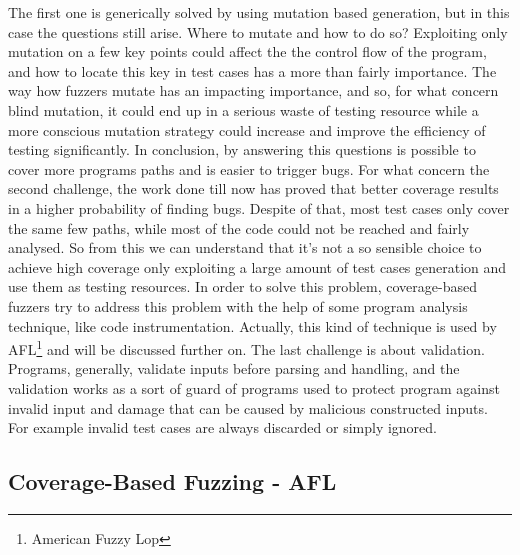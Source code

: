 The first one is generically solved by using mutation based generation, but in this case the questions still
arise. Where to mutate and how to do so? Exploiting only mutation on a few key points could affect the the control flow of the program, and how to locate this key  in test cases has a more than fairly importance.
The way how fuzzers mutate has an impacting importance, and so, for what concern blind mutation, it could end up in a serious waste of testing resource while a more conscious mutation strategy could increase and improve the efficiency
of testing significantly. In conclusion, by answering this questions is possible to cover more programs paths and is easier to trigger bugs.
For what concern the second challenge, the work done till now has proved that better coverage results in a higher probability of finding bugs. Despite of that, 
most test cases only cover the same few paths, while most of the code could not be reached and fairly analysed. So from this we can understand that
it's not a so sensible choice to achieve high coverage only exploiting a large amount of test cases generation and use them as testing resources.
In order to solve this problem, coverage-based fuzzers try to address this problem with the help of some program analysis technique, like code instrumentation. Actually,
this kind of technique is used by AFL\footnote{American Fuzzy Lop} and will be discussed further on. 
The last challenge is about validation. Programs, generally, validate inputs before parsing and handling, and the validation works as a sort of guard of programs used to protect program against invalid input and damage that can be caused by malicious constructed
inputs. For example invalid test cases are always discarded or simply ignored.


\subsection{Coverage-Based Fuzzing - AFL}

